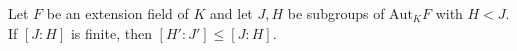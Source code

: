 Let $F$ be an extension field of $K$ and let $J, H$ be subgroups of $\mathrm{Aut}_K F$ with $H < J$. If $[J : H]$ is finite, then $[H' : J'] \leq [J : H]$.
